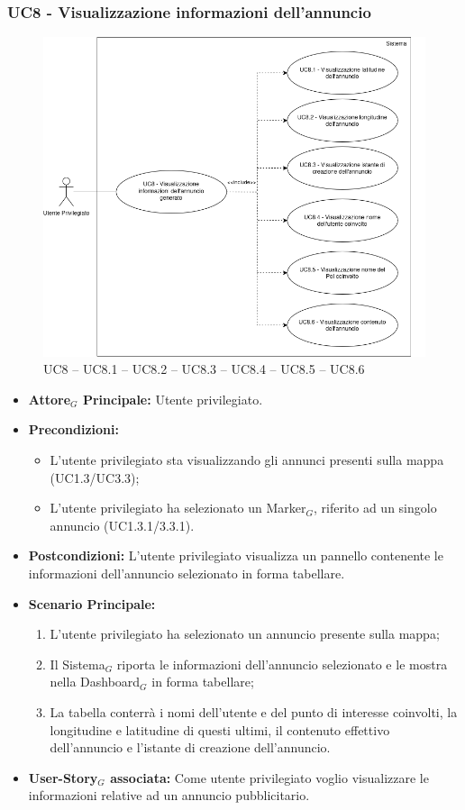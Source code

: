\documentclass[10pt]{article}
\begin{document}
\begin{justify}
\subsubsection{\textbf{UC8 - Visualizzazione informazioni dell'annuncio}}
\begin{figure}[H]
    \centering
    \includegraphics[width=0.7\linewidth]{UC8image.png}
    \caption{UC8 -- UC8.1 -- UC8.2 -- UC8.3 -- UC8.4 -- UC8.5 -- UC8.6}
    \label{fig:UC8}
\end{figure}
\label{UC8}
\begin{itemize}
    \item \textbf{Attore$_G$ Principale:} Utente privilegiato.
    \item \textbf{Precondizioni:} 
        \begin{itemize}
    	        \item L'utente privilegiato sta visualizzando gli annunci presenti sulla mappa (UC1.3/UC3.3);
    	        \item L'utente privilegiato ha selezionato un Marker$_G$, riferito ad un singolo annuncio (UC1.3.1/3.3.1).
        \end{itemize}
    \item \textbf{Postcondizioni:} L'utente privilegiato visualizza un pannello contenente le informazioni dell'annuncio selezionato in forma tabellare. 
    \item \textbf{Scenario Principale:} 
        \begin{enumerate}
          \item L'utente privilegiato ha selezionato un annuncio presente sulla mappa;
          \item Il Sistema$_G$ riporta le informazioni dell'annuncio selezionato e le mostra nella Dashboard$_G$ in forma tabellare;
          \item La tabella conterrà i nomi dell'utente e del punto di interesse coinvolti, la longitudine e latitudine di questi ultimi, il contenuto effettivo dell'annuncio e l'istante di creazione dell'annuncio.
	\end{enumerate}
    \item \textbf{User-Story$_G$ associata:} Come utente privilegiato voglio visualizzare le informazioni relative ad un annuncio pubblicitario.
\end{itemize}

\end{justify}
\end{document}
